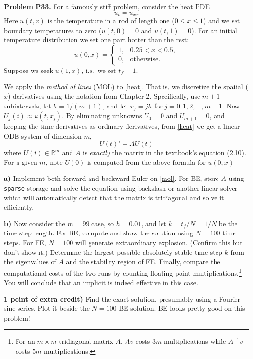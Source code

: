\documentclass[12pt]{amsart}
\newcommand{\RR}{\mathbb{R}}
\newcommand{\prob}[1]{\bigskip\noindent\textbf{#1}\quad }
\newcommand{\epart}[1]{\medskip\noindent\textbf{#1)}\quad }
\begin{document}
\prob{Problem P33.}  For a famously stiff problem, consider the heat PDE
\begin{equation}
u_t = u_{xx}  \label{heat}
\end{equation}
Here $u(t,x)$ is the temperature in a rod of length one ($0 \le x \le 1$) and we set boundary temperatures to zero ($u(t,0)=0$ and $u(t,1)=0$).  For an initial temperature distribution we set one part hotter than the rest:
    $$u(0,x) = \begin{cases} 1, & 0.25 < x < 0.5, \\
                             0, & \text{otherwise}.\end{cases}$$
Suppose we seek $u(1,x)$, i.e.~we set $t_f = 1$.

We apply the \emph{method of lines} (MOL) to \eqref{heat}.  That is, we discretize the spatial ($x$) derivatives using the notation from Chapter 2.  Specifically, use $m+1$ subintervals, let $h=1/(m+1)$, and let $x_j = j h$ for $j=0,1,2,\dots,m+1$.  Now $U_j(t) \approx u(t,x_j)$.  By eliminating unknowns $U_0=0$ and $U_{m+1}=0$, and keeping the time derivatives as ordinary derivatives, from \eqref{heat} we get a linear ODE system of dimension $m$,
\begin{equation}
U(t)' = A U(t)  \label{mol}
\end{equation}
where $U(t) \in \RR^m$ and $A$ is \emph{exactly} the matrix in the textbook's equation (2.10).  For a given $m$, note $U(0)$ is computed from the above formula for $u(0,x)$.

\epart{a}  Implement both forward and backward Euler on \eqref{mol}.  For BE, store $A$ using \texttt{sparse} storage and solve the equation using backslash or another linear solver which will automatically detect that the matrix is tridiagonal and solve it efficiently.

\epart{b}  Now consider the $m=99$ case, so $h=0.01$, and let $k=t_f/N=1/N$ be the time step length.  For BE, compute and show the solution using $N=100$ time steps.  For FE, $N=100$ will generate extraordinary explosion.  (Confirm this but don't show it.)  Determine the largest-possible absolutely-stable time step $k$ from the eigenvalues of $A$ and the stability region of FE.  Finally, compare the computational costs of the two runs by counting floating-point multiplications.\footnote{For an $m\times m$ tridiagonal matrix $A$, $A v$ costs $3m$ multiplications while $A^{-1} v$ costs $5m$ multiplications.}  You will conclude that an implicit is indeed effective in this case.

\epart{1 point of extra credit}  Find the exact solution, presumably using a Fourier sine series.  Plot it beside the $N=100$ BE solution.  BE looks pretty good on this problem!
\end{document}
